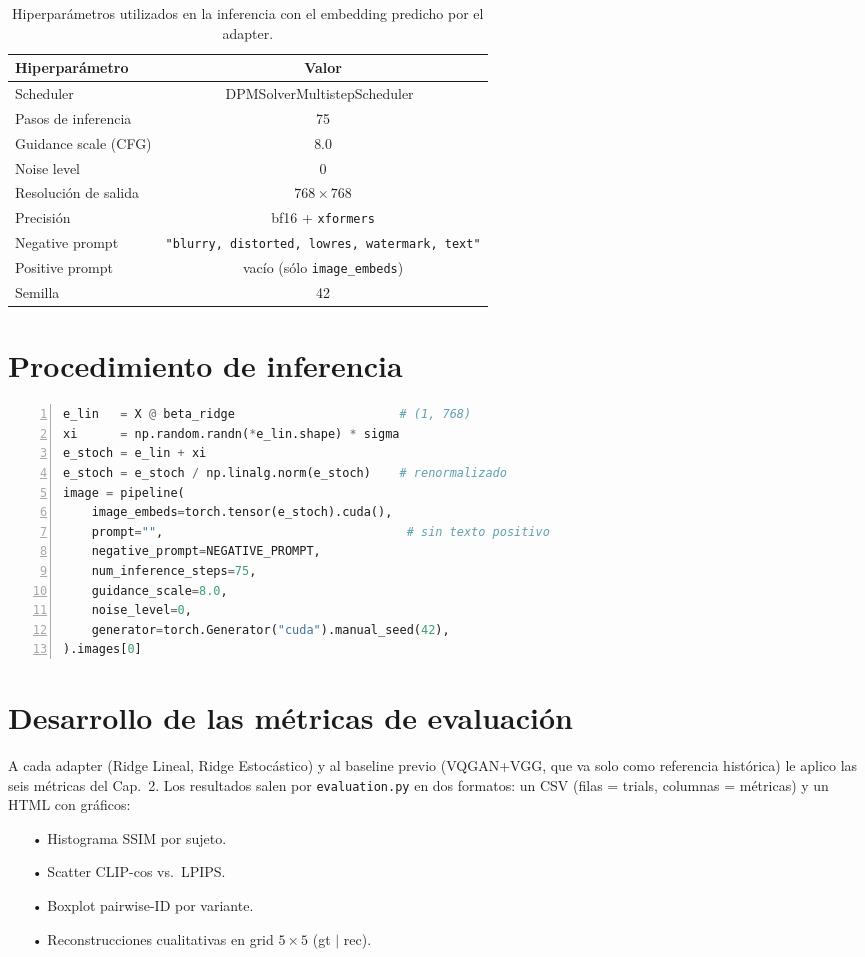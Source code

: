 \begin{table}[H]
\centering
\begin{tabular}{| l | c |}
\hline
\textbf{Hiperparámetro} & \textbf{Valor} \\ \hline
Scheduler & DPMSolverMultistepScheduler~\cite{lu2022dpmsolver} \\ \hline
Pasos de inferencia & 75 \\ \hline
Guidance scale (CFG) & 8.0 \\ \hline
Noise level & 0 \\ \hline
Resolución de salida & $768\times768$ \\ \hline
Precisión & bf16 + \texttt{xformers} \\ \hline
Negative prompt & \texttt{"blurry, distorted, lowres, watermark, text"} \\ \hline
Positive prompt & vacío (sólo \texttt{image\_embeds}) \\ \hline
Semilla & 42 \\ \hline
\end{tabular}
\caption[Configuración inferencia SD 2.1 unCLIP]{Hiperparámetros utilizados en la inferencia con el embedding predicho por el adapter.}
\label{table:sd_hparams}
\end{table}

\section{Procedimiento de inferencia}

\begin{lstlisting}[language=Python, caption=Inferencia por trial (Ridge Estocástico), label={lst:infer}, numbers=left]
e_lin   = X @ beta_ridge                       # (1, 768)
xi      = np.random.randn(*e_lin.shape) * sigma
e_stoch = e_lin + xi
e_stoch = e_stoch / np.linalg.norm(e_stoch)    # renormalizado
image = pipeline(
    image_embeds=torch.tensor(e_stoch).cuda(),
    prompt="",                                  # sin texto positivo
    negative_prompt=NEGATIVE_PROMPT,
    num_inference_steps=75,
    guidance_scale=8.0,
    noise_level=0,
    generator=torch.Generator("cuda").manual_seed(42),
).images[0]
\end{lstlisting}

\section{Desarrollo de las métricas de evaluación}

A cada adapter (Ridge Lineal, Ridge Estocástico) y al baseline previo (VQGAN+VGG, que va solo como referencia histórica) le aplico las seis métricas del Cap.~2. Los resultados salen por \texttt{evaluation.py} en dos formatos: un CSV (filas = trials, columnas = métricas) y un HTML con gráficos:

\begin{itemize}
\item[•] Histograma SSIM por sujeto.
\item[•] Scatter CLIP-cos vs.\ LPIPS.
\item[•] Boxplot pairwise-ID por variante.
\item[•] Reconstrucciones cualitativas en grid $5\times 5$ (gt $\mid$ rec).
\end{itemize}

\afterpage{\blankpage}

